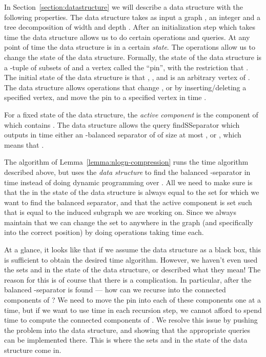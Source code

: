 \documentclass[a4paper,11pt]{article}
\theoremstyle{definition}
\theoremstyle{remark}
\newcommand{\qSsep}{\textnormal{findSSeparator}}
\begin{document}
In Section~\ref{section:datastructure} we will describe a data
structure with the following properties.  The data structure takes as
input a graph , an integer  and a tree decomposition 
of width  and depth .  After an initialization step
which takes  time the data structure allows us to do certain
operations and queries.  At any point of time the data structure is in
a certain {\em state}.  The operations allow us to change the state of
the data structure.  Formally, the state of the data structure is a
-tuple  of subsets of  and a vertex  called
the ``pin'', with the restriction that .  The initial
state of the data structure is that , , and
 is an arbitrary vertex of .  The data structure
allows operations that change ,  or  by inserting/deleting a
specified vertex, and move the pin to a specified vertex in time
.

For a fixed state of the data structure, the {\em active component}
 is the component of  which contains .  The
data structure allows the query \qSsep{} which outputs in time  either an -balanced separator  of 
of size at most , or , which means that .

The algorithm of Lemma~\ref{lemma:nlogn-compression} runs the
 time algorithm described above, but uses the \emph{data
  structure} to find the balanced -separator in time  instead of doing dynamic programming over .  All we need
to make sure is that the  in the state of the data structure is
always equal to the set  for which we want to find the balanced
separator, and that the active component  is set such that  is equal to the induced subgraph we are working on.  Since we
always maintain that  we can change the set  to
anywhere in the graph (and specifically into the correct position) by
doing  operations taking  time each.

At a glance, it looks like that if we assume the data structure as a
black box, this is sufficient to obtain the desired 
time algorithm.  However, we haven't even used the sets  and  in
the state of the data structure, or described what they mean! The
reason for this is of course that there is a complication.  In
particular, after the balanced -separator  is found ---
how can we recurse into the connected components of ? We need to move the pin into each of
these components one at a time, but if we want to use 
time in each recursion step, we cannot afford to spend 
time to compute the connected components of .  We resolve this issue by pushing the problem into the
data structure, and showing that the appropriate queries can be
implemented there.  This is where the sets  and  in the state of
the data structure come in.
\end{document}
